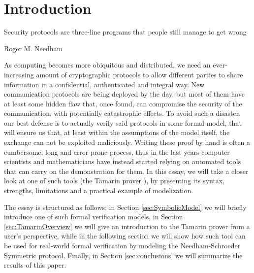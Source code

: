 \documentclass[fleqn,10pt]{SelfArx} %
\affiliation{\textsuperscript{1}\textit{Student number 147681}, \lstinline|dambrosi.denis@spes.uniud.it|} %
\begin{document}
\maketitle %

\tableofcontents %

\thispagestyle{empty} %


\section*{Introduction} %


\epigraph{Security protocols are three-line programs that people still manage to get wrong}{Roger M. Needham}

As computing becomes more obiquitous and distributed, we need an ever-increasing amount of cryptographic protocols to allow different parties to share information in a confidential, authenticated and integral way. New communication protocols are being deployed by the day, but most of them have at least some hidden flaw that, once found, can compromise the security of the communication, with potentially catastrophic effects. To avoid such a disaster, our best defense is to actually verify said protocols in some formal model, that will ensure us that, at least within the assumptions of the model itself, the exchange can not be exploited maliciously. Writing these proof by hand is often a cumbersome, long and error-prone process, thus in the last years computer scientists and mathematicians have instead started relying on automated tools that can carry on the demonstration for them. In this essay, we will take a closer look at one of such tools (the Tamarin prover \cite{tamarin}), by presenting its syntax, strengths, limitations and a practical example of modelization.

The essay is structured as follows: in Section \ref{sec:SymbolicModel} we will briefly introduce one of such formal verification models, in Section \ref{sec:TamarinOverview} we will give an introduction to the Tamarin prover from a user's perspective, while in the following section we will show how such tool can be used for real-world formal verification by modeling the Needham-Schroeder Symmetric protocol. Finally, in Section \ref{sec:conclusions} we will summarize the results of this paper.
\end{document}
